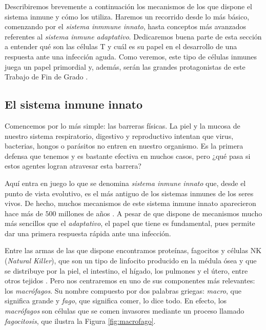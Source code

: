 Describiremos brevemente a continuación los mecanismos de los que dispone el sistema inmune y cómo los utiliza. Haremos un recorrido desde lo más básico, comenzando por el \textit{sistema inmmune innato}, hasta conceptos más avanzados referentes al \textit{sistema inmune adaptativo}. Dedicaremos buena parte de esta sección a entender qué son las células T y cuál es su papel en el desarrollo de una respuesta ante una infección aguda. Como veremos, este tipo de células inmunes juega un papel primordial y, además, serán las grandes protagonistas de este Trabajo de Fin de Grado \citep{JTB}.  

\subsection{El sistema inmune innato}
\label{sub:sistInmInnato}

Comencemos por lo más simple: las barreras físicas. La piel y la mucosa de nuestro sistema respiratorio, digestivo y reproductivo intentan que virus, bacterias, hongos o parásitos no entren en nuestro organismo. Es la primera defensa que tenemos y es bastante efectiva en muchos casos, pero ¿qué pasa si estos agentes logran atravesar esta barrera?

Aquí entra en juego lo que se denomina \textit{sistema inmune innato} que, desde el punto de vista evolutivo, es el más antiguo de los sistemas inmunes de los seres vivos. De hecho, muchos mecanismos de este sistema inmune innato aparecieron hace más de $500$ millones de años \citep{theHowItWorks}. A pesar de que dispone de mecanismos mucho más sencillos que el \textit{adaptativo}, el papel que tiene es fundamental, pues permite dar una primera respuesta rápida ante una infección. 

Entre las armas de las que dispone encontramos proteínas, fagocitos y células NK (\textit{Natural Killer}), que son un tipo de linfocito producido en la médula ósea y que se distribuye por la piel, el intestino, el hígado, los pulmones y el útero, entre otros tejidos \citep{celulasNK}. Pero nos centraremos en uno de sus componentes más relevantes: los \textit{macrófagos}. Su nombre compuesto por dos palabras griegas: \textit{macro}, que significa grande y \textit{fago}, que significa comer, lo dice todo. En efecto, los \textit{macrófagos} son células que se comen invasores mediante un proceso llamado \textit{fagocitosis}, que ilustra la Figura \ref{fig:macrofago}. %


